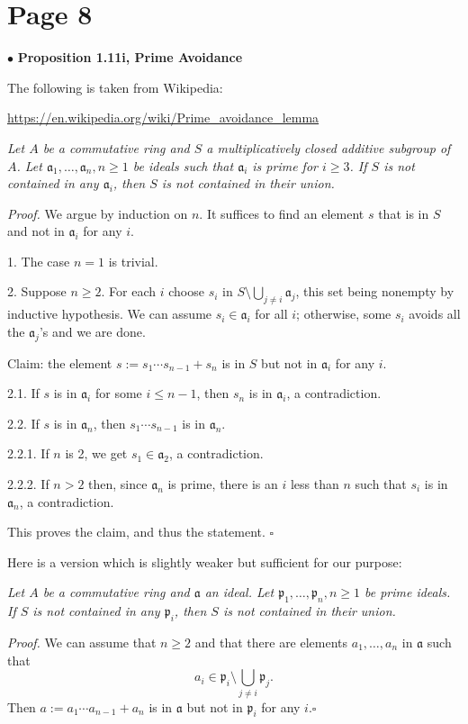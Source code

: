 \documentclass[12pt]{article}
\newcommand{\mf}{\mathfrak}
\newcommand{\bu}{\bullet}
\begin{document}
\section{Page 8}%

$\bu$ \textbf{\Large Proposition 1.11i, Prime Avoidance}%

The following is taken from Wikipedia:

\href{https://en.wikipedia.org/wiki/Prime_avoidance_lemma}{https://en.wikipedia.org/wiki/Prime\_avoidance\_lemma}

\emph{Let $A$ be a commutative ring and $S$ a multiplicatively closed additive subgroup of $A$. Let $\mf a_1,\dots,\mf a_n,n\ge1$ be ideals such that $\mf a_i$ is prime for $i\ge3$. If $S$ is not contained in any $\mf a_i$, then $S$ is not contained in their union.}

\emph{Proof.} We argue by induction on $n$. It suffices to find an element $s$ that is in $S$ and not in $\mf a_i$ for any $i$. 

1. The case $n=1$ is trivial. 

2. Suppose $n\ge2$. For each $i$ choose $s_i$ in $S\setminus\bigcup_{j \ne i}\mf a_j$, this set being nonempty by inductive hypothesis. We can assume $s_i \in \mf a_i$ for all $i$; otherwise, some $s_i$ avoids all the $\mf a_j$'s and we are done. 

Claim: the element $s:=s_1\cdots s_{n-1}+s_n$ is in $S$ but not in $\mf a_i$ for any $i$. 

2.1. If $s$ is in $\mf a_i$ for some $i\le n-1$, then $s_n$ is in $\mf a_i$, a contradiction. 

2.2. If $s$ is in $\mf a_n$, then $s_1\cdots s_{n-1}$ is in $\mf a_n$. 

2.2.1. If $n$ is 2, we get $s_1\in \mf a_2$, a contradiction.

2.2.2. If $n>2$ then, since $\mf a_n$ is prime, there is an $i$ less than $n$ such that $s_i$ is in $\mf a_n$, a contradiction.

This proves the claim, and thus the statement. $\square$

Here is a version which is slightly weaker but sufficient for our purpose:

\emph{Let $A$ be a commutative ring and $\mf a$ an ideal. Let $\mf p_1,\dots,\mf p_n,n\ge1$ be prime ideals. If $S$ is not contained in any $\mf p_i$, then $S$ is not contained in their union.}

\emph{Proof.} We can assume that $n\ge2$ and that there are elements $a_1,\dots,a_n$ in $\mf a$ such that 
$$
a_i\in\mf p_i\setminus\bigcup_{j \ne i}\mf p_j.
$$ 
Then $a:=a_1\cdots a_{n-1}+a_n$ is in $\mf a$ but not in $\mf p_i$ for any $i$.$\square$
\end{document}
